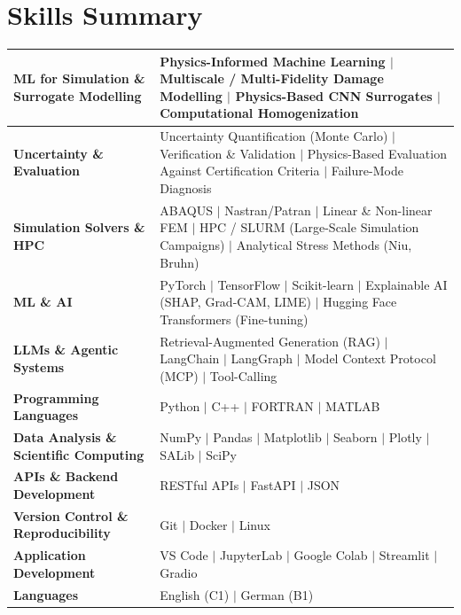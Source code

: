 \documentclass[a4paper,20pt]{article}
\begin{document}
\section{\color{blue}Skills Summary}
\begin{tabular}{|p{8cm}p{10.5cm}|}

\hline
\textbf{ML for Simulation \& Surrogate Modelling} &
Physics-Informed Machine Learning \(\vert\) Multiscale / Multi-Fidelity Damage Modelling \(\vert\) Physics-Based CNN Surrogates \(\vert\) Computational Homogenization \\
\hline

\textbf{Uncertainty \& Evaluation} &
Uncertainty Quantification (Monte Carlo) \(\vert\) Verification \& Validation \(\vert\) Physics-Based Evaluation Against Certification Criteria \(\vert\) Failure-Mode Diagnosis \\
\hline

\textbf{Simulation Solvers \& HPC} &
ABAQUS \(\vert\) Nastran/Patran \(\vert\) Linear \& Non-linear FEM \(\vert\) HPC / SLURM (Large-Scale Simulation Campaigns) \(\vert\) Analytical Stress Methods (Niu, Bruhn) \\
\hline

\textbf{ML \& AI} &
PyTorch \(\vert\) TensorFlow \(\vert\) Scikit-learn \(\vert\) Explainable AI (SHAP, Grad-CAM, LIME) \(\vert\) Hugging Face Transformers (Fine-tuning) \\
\hline

\textbf{LLMs \& Agentic Systems} &
Retrieval-Augmented Generation (RAG) \(\vert\) LangChain \(\vert\) LangGraph \(\vert\) Model Context Protocol (MCP) \(\vert\) Tool-Calling \\
\hline

\textbf{Programming Languages} &
Python \(\vert\) C++ \(\vert\) FORTRAN \(\vert\) MATLAB \\
\hline

\textbf{Data Analysis \& Scientific Computing} &
NumPy \(\vert\) Pandas \(\vert\) Matplotlib \(\vert\) Seaborn \(\vert\) Plotly \(\vert\) SALib \(\vert\) SciPy \\
\hline

\textbf{APIs \& Backend Development} &
RESTful APIs \(\vert\) FastAPI \(\vert\) JSON \\
\hline

\textbf{Version Control \& Reproducibility} &
Git \(\vert\) Docker \(\vert\) Linux \\
\hline

\textbf{Application Development} &
VS Code \(\vert\) JupyterLab \(\vert\) Google Colab \(\vert\) Streamlit \(\vert\) Gradio \\
\hline

\textbf{Languages} &
English (C1) \(\vert\) German (B1) \\
\hline
\end{tabular}
\end{document}
